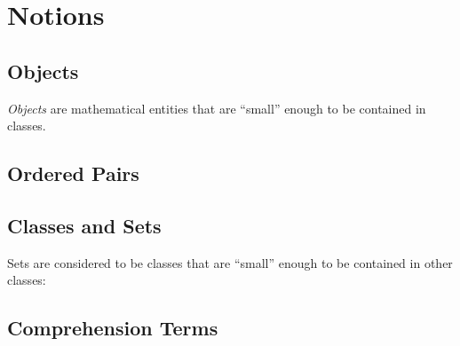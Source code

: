 \documentclass{stex}
\begin{document}
\section{Notions}\label{sec:notions}

\subsection{Objects}\label{sec:objects}

\emph{Objects} are mathematical entities that are ``small'' enough to be
contained in classes.



\subsection{Ordered Pairs}\label{sec:ordered-pairs}



\subsection{Classes and Sets}\label{sec:classes-and-sets}


Sets are considered to be classes that are ``small'' enough to be contained in
other classes:



\subsection{Comprehension Terms}\label{sec:comprehension-terms}
\end{document}
